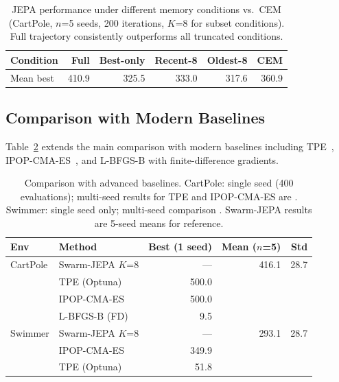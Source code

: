 \begin{table}[t]
\centering
\caption{JEPA performance under different memory conditions vs.\ CEM
(CartPole, $n$=5 seeds, 200 iterations, $K$=8 for subset conditions).
Full trajectory consistently outperforms all truncated conditions.}
\label{tab:memory_structure}
\begin{tabular}{lrrrrr}
\toprule
Condition & Full & Best-only & Recent-8 & Oldest-8 & CEM \\
\midrule
Mean best & 410.9 & 325.5 & 333.0 & 317.6 & 360.9 \\
\bottomrule
\end{tabular}
\end{table}

\subsection{Comparison with Modern Baselines}
\label{sec:modern_baselines}

Table~\ref{tab:advanced_baselines} extends the main comparison with
modern baselines including TPE~\citep{bergstra2011algorithms},
IPOP-CMA-ES~\citep{auger2005restart}, and L-BFGS-B with
finite-difference gradients.

\begin{table}[t]
\centering
\caption{Comparison with advanced baselines.
CartPole: single seed (400 evaluations); multi-seed results for
TPE and IPOP-CMA-ES are .
Swimmer: single seed only; multi-seed comparison .
Swarm-JEPA results are 5-seed means for reference.}
\label{tab:advanced_baselines}
\begin{tabular}{llrrr}
\toprule
Env & Method & Best (1 seed) & Mean ($n$=5) & Std \\
\midrule
CartPole & Swarm-JEPA $K$=8 & --- & 416.1 & 28.7 \\
         & TPE (Optuna)     & 500.0 & \todo{} & \todo{} \\
         & IPOP-CMA-ES      & 500.0 & \todo{} & \todo{} \\
         & L-BFGS-B (FD)   & 9.5   & \todo{} & \todo{} \\
\midrule
Swimmer  & Swarm-JEPA $K$=8 & ---  & 293.1  & 28.7 \\
         & IPOP-CMA-ES      & 349.9 & \todo{} & \todo{} \\
         & TPE (Optuna)     & 51.8  & \todo{} & \todo{} \\
\bottomrule
\end{tabular}
\end{table}

